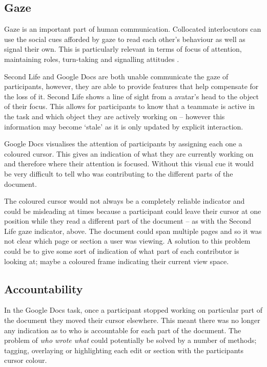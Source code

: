 \documentclass{acm_proc_article-sp}
\begin{document}
\subsection{Gaze}

Gaze is an important part of human communication. Collocated interlocutors can use the social cues afforded by gaze to read each other's behaviour as well as signal their own. This is particularly relevant in terms of focus of attention, maintaining roles, turn-taking and signalling attitudes \cite{argyle1976gaze}.

Second Life and Google Docs are both unable communicate the gaze of participants, however, they are able to provide features that help compensate for the loss of it. Second Life shows a line of sight from a avatar's head to the object of their focus. This allows for participants to know that a teammate is active in the task and which object they are actively working on -- however this information may become `stale' as it is only updated by explicit interaction.

Google Docs visualises the attention of participants by assigning each one a coloured cursor. This gives an indication of what they are currently working on and therefore where their attention is focused. Without this visual cue it would be very difficult to tell who was contributing to the different parts of the document.

The coloured cursor would not always be a completely reliable indicator and could be misleading at times because a participant could leave their cursor at one position while they read a different part of the document -- as with the Second Life gaze indicator, above. The document could span multiple pages and so it was not clear which page or section a user was viewing. A solution to this problem could be to give some sort of indication of what part of each contributor is looking at; maybe a coloured frame indicating their current view space.

\subsection{Accountability}

In the Google Docs task, once a participant stopped working on particular part of the document they moved their cursor elsewhere. This meant there was no longer any indication as to who is accountable for each part of the document. The problem of \emph{who wrote what} could potentially be solved by a number of methods; tagging, overlaying or highlighting each edit or section with the participants cursor colour. 
\end{document}
